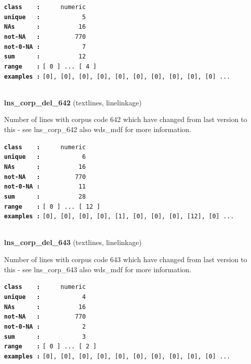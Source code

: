 \documentclass[]{article}
\begin{document}
\textbf{\texttt{class\ \ \ \ :}} \texttt{~~~~~numeric}\\
\textbf{\texttt{unique\ \ \ :}} \texttt{~~~~~~~~~~~5}\\
\textbf{\texttt{NAs\ \ \ \ \ \ :}} \texttt{~~~~~~~~~~16}\\
\textbf{\texttt{not-NA\ \ \ :}} \texttt{~~~~~~~~~770}\\
\textbf{\texttt{not-0-NA\ :}} \texttt{~~~~~~~~~~~7}\\
\textbf{\texttt{sum\ \ \ \ \ \ :}} \texttt{~~~~~~~~~~12}\\
\textbf{\texttt{range\ \ \ \ :}}
\texttt{{[}\ 0\ {]}\ ...\ {[}\ 4\ {]}}\\
\textbf{\texttt{examples\ :}}
\texttt{{[}0{]},\ {[}0{]},\ {[}0{]},\ {[}0{]},\ {[}0{]},\ {[}0{]},\ {[}0{]},\ {[}0{]},\ {[}0{]},\ {[}0{]}\ ...}\\

~

\textbf{lns\_corp\_del\_642} (textlines, linelinkage)

Number of lines with corpus code 642 which have changed from last
version to this - see lns\_corp\_642 also wds\_mdf for more information.

\textbf{\texttt{class\ \ \ \ :}} \texttt{~~~~~numeric}\\
\textbf{\texttt{unique\ \ \ :}} \texttt{~~~~~~~~~~~6}\\
\textbf{\texttt{NAs\ \ \ \ \ \ :}} \texttt{~~~~~~~~~~16}\\
\textbf{\texttt{not-NA\ \ \ :}} \texttt{~~~~~~~~~770}\\
\textbf{\texttt{not-0-NA\ :}} \texttt{~~~~~~~~~~11}\\
\textbf{\texttt{sum\ \ \ \ \ \ :}} \texttt{~~~~~~~~~~28}\\
\textbf{\texttt{range\ \ \ \ :}}
\texttt{{[}\ 0\ {]}\ ...\ {[}\ 12\ {]}}\\
\textbf{\texttt{examples\ :}}
\texttt{{[}0{]},\ {[}0{]},\ {[}0{]},\ {[}0{]},\ {[}1{]},\ {[}0{]},\ {[}0{]},\ {[}0{]},\ {[}12{]},\ {[}0{]}\ ...}\\

~

\textbf{lns\_corp\_del\_643} (textlines, linelinkage)

Number of lines with corpus code 643 which have changed from last
version to this - see lns\_corp\_643 also wds\_mdf for more information.

\textbf{\texttt{class\ \ \ \ :}} \texttt{~~~~~numeric}\\
\textbf{\texttt{unique\ \ \ :}} \texttt{~~~~~~~~~~~4}\\
\textbf{\texttt{NAs\ \ \ \ \ \ :}} \texttt{~~~~~~~~~~16}\\
\textbf{\texttt{not-NA\ \ \ :}} \texttt{~~~~~~~~~770}\\
\textbf{\texttt{not-0-NA\ :}} \texttt{~~~~~~~~~~~2}\\
\textbf{\texttt{sum\ \ \ \ \ \ :}} \texttt{~~~~~~~~~~~3}\\
\textbf{\texttt{range\ \ \ \ :}}
\texttt{{[}\ 0\ {]}\ ...\ {[}\ 2\ {]}}\\
\textbf{\texttt{examples\ :}}
\texttt{{[}0{]},\ {[}0{]},\ {[}0{]},\ {[}0{]},\ {[}0{]},\ {[}0{]},\ {[}0{]},\ {[}0{]},\ {[}0{]},\ {[}0{]}\ ...}\\
\end{document}
